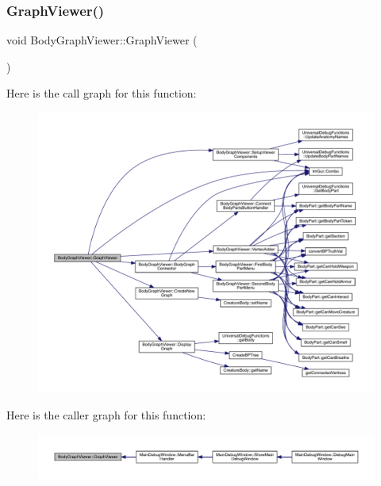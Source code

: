 \subsubsection{\texorpdfstring{Graph\+Viewer()}{GraphViewer()}}
{\footnotesize\ttfamily void Body\+Graph\+Viewer\+::\+Graph\+Viewer (\begin{DoxyParamCaption}{ }\end{DoxyParamCaption})}

Here is the call graph for this function\+:
\nopagebreak
\begin{figure}[H]
\begin{center}
\leavevmode
\includegraphics[width=350pt]{df/d9e/namespace_body_graph_viewer_af9dda6b999602264957b77351415c57d_cgraph}
\end{center}
\end{figure}
Here is the caller graph for this function\+:
\nopagebreak
\begin{figure}[H]
\begin{center}
\leavevmode
\includegraphics[width=350pt]{df/d9e/namespace_body_graph_viewer_af9dda6b999602264957b77351415c57d_icgraph}
\end{center}
\end{figure}
\mbox{\label{namespace_body_graph_viewer_a8f24a618383585f0b013da6054244e2c}} 

